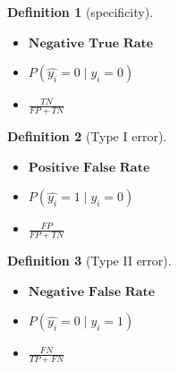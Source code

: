 \documentclass{article}
\theoremstyle{MyNonumberplain}
\theoremstyle{break}
\theoremstyle{break}
\theoremstyle{break}
\theoremstyle{break}
\newtheorem{definition}{Definition}[section]
\begin{document}
\begin{defbox}
    \begin{definition}[specificity]
        \begin{itemize}
            below are things equivalent to specificity:
            \item $\textbf{Negative True Rate}$
            \item $P(\hat{y_i} = 0 \mid y_i = 0)$
            \item $\frac{TN}{FP + TN}$
        \end{itemize}
    \end{definition}
\end{defbox}

\begin{defbox}
    \begin{definition}[Type I error]
        \begin{itemize}
            below are things equivalent to Type I error:
            \item $\textbf{Positive False Rate}$
            \item $P(\hat{y_i} = 1 \mid y_i = 0)$
            \item $\frac{FP}{FP + TN}$
        \end{itemize}
    \end{definition}
\end{defbox}

\begin{defbox}
    \begin{definition}[Type II error]
        \begin{itemize}
            below are things equivalent to Type II error:
            \item $\textbf{Negative False Rate}$
            \item $P(\hat{y_i} = 0 \mid y_i = 1)$
            \item $\frac{FN}{TP + FN}$
        \end{itemize}
    \end{definition}
\end{defbox}
\end{document}
